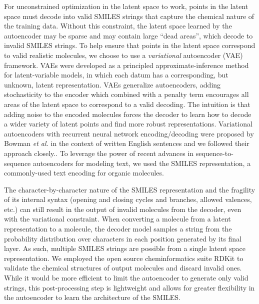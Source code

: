 For unconstrained optimization in the latent space to work, points in the latent space must decode into valid SMILES strings that capture the chemical nature of the training data.
Without this constraint, the latent space learned by the autoencoder may be sparse and may contain large ``dead areas'', which decode to invalid SMILES strings.
To help ensure that points in the latent space correspond to valid realistic molecules, we choose to use a \emph{variational} autoencoder (VAE)\cite{kingma2013auto} framework.
VAEs were developed as a principled approximate-inference method for latent-variable models, in which each datum has a corresponding, but unknown, latent representation.
VAEs generalize autoencoders, adding stochasticity to the encoder which combined with a penalty term encourages all areas of the latent space to correspond to a valid decoding.
The intuition is that adding noise to the encoded molecules forces the decoder to learn how to decode a wider variety of latent points and find more robust representations.
Variational autoencoders with recurrent neural network encoding/decoding were proposed by Bowman \textit{et al.} in the context of written English sentences and we followed their approach closely.\cite{bowman2015generating}.
To leverage the power of recent advances in sequence-to-sequence autoencoders for modeling text, we used the SMILES\cite{Weininger_1988} representation, a commonly-used text encoding for organic molecules.

The character-by-character nature of the SMILES representation and the fragility of its internal syntax (opening and closing cycles and branches, allowed valences, etc.) can still result in the output of invalid molecules from the decoder, even with the variational constraint. 
When converting a molecule from a latent representation to a molecule, the decoder model samples a string from the probability distribution over characters in each position generated by its final layer. As such, multiple SMILES strings are possible from a single latent space representation. We employed the open source cheminformatics suite RDKit\cite{rdkit} to validate the chemical structures of output molecules and discard invalid ones. 
While it would be more efficient to limit the autoencoder to generate only valid strings, this post-processing step is lightweight and allows for greater flexibility in the autoencoder to learn the architecture of the SMILES.

